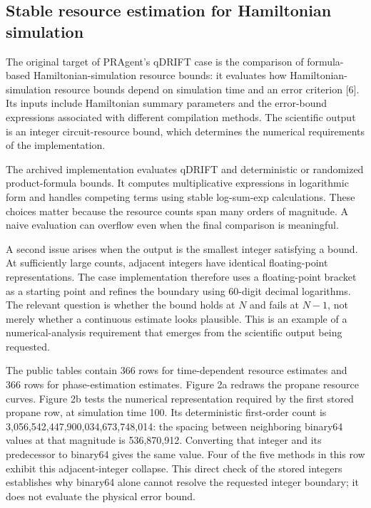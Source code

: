 \documentclass[10pt,a4paper]{article}
\begin{document}
\subsection{Stable resource estimation for Hamiltonian
simulation}\label{stable-resource-estimation-for-hamiltonian-simulation}

The original target of PRAgent's qDRIFT case is the comparison of
formula-based Hamiltonian-simulation resource bounds: it evaluates how
Hamiltonian-simulation resource bounds depend on simulation time and an
error criterion {[}6{]}. Its inputs include Hamiltonian summary
parameters and the error-bound expressions associated with different
compilation methods. The scientific output is an integer
circuit-resource bound, which determines the numerical requirements of
the implementation.

The archived implementation evaluates qDRIFT and deterministic or
randomized product-formula bounds. It computes multiplicative
expressions in logarithmic form and handles competing terms using stable
log-sum-exp calculations. These choices matter because the resource
counts span many orders of magnitude. A naive evaluation can overflow
even when the final comparison is meaningful.

A second issue arises when the output is the smallest integer satisfying
a bound. At sufficiently large counts, adjacent integers have identical
floating-point representations. The case implementation therefore uses a
floating-point bracket as a starting point and refines the boundary
using 60-digit decimal logarithms. The relevant question is whether the
bound holds at \(N\) and fails at \(N-1\), not merely whether a
continuous estimate looks plausible. This is an example of a
numerical-analysis requirement that emerges from the scientific output
being requested.

The public tables contain 366 rows for time-dependent resource estimates
and 366 rows for phase-estimation estimates. Figure 2a redraws the
propane resource curves. Figure 2b tests the numerical representation
required by the first stored propane row, at simulation time 100. Its
deterministic first-order count is 3,056,542,447,900,034,673,748,014:
the spacing between neighboring binary64 values at that magnitude is
536,870,912. Converting that integer and its predecessor to binary64
gives the same value. Four of the five methods in this row exhibit this
adjacent-integer collapse. This direct check of the stored integers
establishes why binary64 alone cannot resolve the requested integer
boundary; it does not evaluate the physical error bound.
\end{document}
